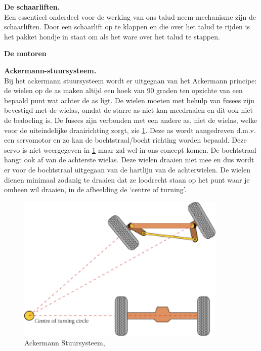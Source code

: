\textbf{De schaarliften.}\\
Een essentieel onderdeel voor de werking van ons talud-neem-mechanisme zijn de schaarliften. Door een schaarlift op te klappen en die over het talud te rijden is het pakket hondje in staat om als het ware over het talud te stappen.\\
\vspace{\baselineskip}

\textbf{De motoren}

\textbf{Ackermann-stuursysteem.}\\
Bij het ackermann stuursysteem wordt er uitgegaan van het Ackermann principe: de wielen op de as maken altijd een hoek van 90 graden ten opzichte van een bepaald punt wat achter de as ligt. De wielen moeten met behulp van fusees zijn bevestigd met de wielas, omdat de starre as niet kan meedraaien en dit ook niet de bedoeling is. De fusees zijn verbonden met een andere as, niet de wielas, welke voor de uiteindelijke draairichting zorgt, zie \cref{fig: ackermann_FBD}. Deze as wordt aangedreven d.m.v. een servomotor en zo kan de bochtstraal/bocht richting worden bepaald. Deze servo is niet weergegeven in \cref{fig: ackermann_FBD} maar zal wel in ons concept komen. De bochtstraal hangt ook af van de achterste wielas. Deze wielen draaien niet mee en dus wordt er voor de bochtstraal uitgegaan van de hartlijn van de achterwielen. De wielen dienen minimaal zodanig te draaien dat ze loodrecht staan op het punt waar je omheen wil draaien, in de afbeelding de ‘centre of turning’.\\

\begin{figure}[H]
    \includegraphics[width = 100mm]{04_conceptdimensionering/ackermann.png}
    \caption{Ackermann Stuursysteem, }
    \label{fig: ackermann_FBD}
\end{figure}
\vspace{1mm}

